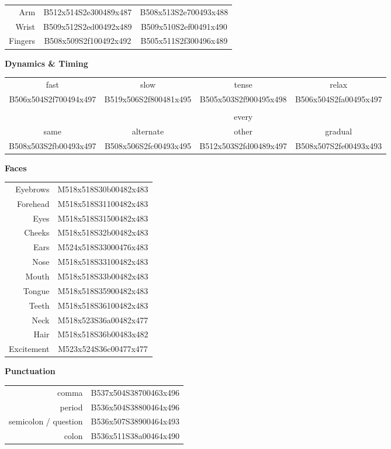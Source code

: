 \documentclass{article}
\begin{document}
\begin{multicols}{3}
\noindent
\begin{tabular}{rcc}
Arm&B512x514S2e300489x487&B508x513S2e700493x488\\
Wrist&B509x512S2ed00492x489&B509x510S2ef00491x490\\
Fingers&B508x509S2f100492x492&B505x511S2f300496x489\\
\end{tabular}

\vfil

\columnbreak

\noindent
\textbf{Dynamics \& Timing}

\noindent
\begin{tabular}{cccc}
fast&slow&tense&relax\\
B506x504S2f700494x497&B519x506S2f800481x495&B505x503S2f900495x498&B506x504S2fa00495x497\\
\\
&&every\\
same&alternate&other&gradual\\
B508x503S2fb00493x497&B508x506S2fc00493x495&B512x503S2fd00489x497&B508x507S2fe00493x493\\
\end{tabular}

\noindent
\textbf{Faces}

\noindent
\begin{tabular}{rc}
Eyebrows&M518x518S30b00482x483\\
Forehead&M518x518S31100482x483\\
Eyes&M518x518S31500482x483\\
Cheeks&M518x518S32b00482x483\\
Ears&M524x518S33000476x483\\
Nose&M518x518S33100482x483\\
Mouth&M518x518S33b00482x483\\
Tongue&M518x518S35900482x483\\
Teeth&M518x518S36100482x483\\
Neck&M518x523S36a00482x477\\
Hair&M518x518S36b00483x482\\
Excitement&M523x524S36c00477x477\\
\end{tabular}

\noindent
\textbf{Punctuation}

\noindent
\begin{tabular}{rc}
comma&B537x504S38700463x496\\
period&B536x504S38800464x496\\
semicolon / question&B536x507S38900464x493\\
colon&B536x511S38a00464x490\\
\end{tabular}
\end{multicols}
\end{document}
